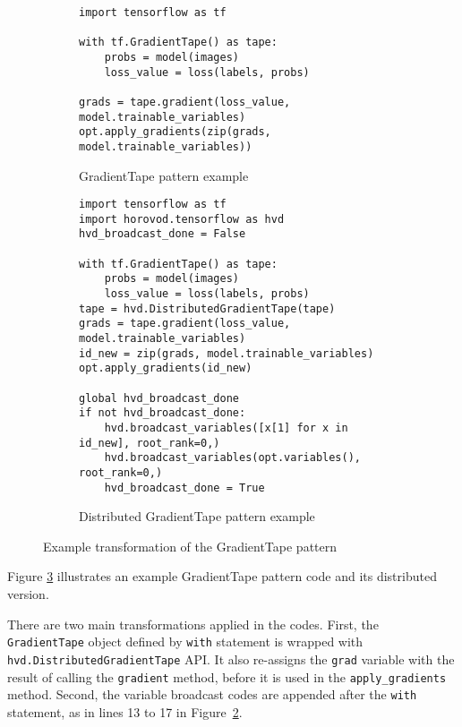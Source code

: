 \begin{figure}[ht!]
  \centering
  \begin{subfigure}[t]{\textwidth}
    \begin{lstlisting}[style=mpython]
import tensorflow as tf

with tf.GradientTape() as tape:
    probs = model(images)
    loss_value = loss(labels, probs)

grads = tape.gradient(loss_value, model.trainable_variables)
opt.apply_gradients(zip(grads, model.trainable_variables))\end{lstlisting}
    \caption{GradientTape pattern example}
    \label{fig:trans:gtapetrans:a}
  \end{subfigure}
  \hspace{5mm}
  \begin{subfigure}[t]{1\textwidth}
    \begin{lstlisting}[style=mpython]
import tensorflow as tf
import horovod.tensorflow as hvd
hvd_broadcast_done = False

with tf.GradientTape() as tape:
    probs = model(images)
    loss_value = loss(labels, probs)
tape = hvd.DistributedGradientTape(tape)
grads = tape.gradient(loss_value, model.trainable_variables)
id_new = zip(grads, model.trainable_variables)
opt.apply_gradients(id_new)

global hvd_broadcast_done
if not hvd_broadcast_done:
    hvd.broadcast_variables([x[1] for x in id_new], root_rank=0,)
    hvd.broadcast_variables(opt.variables(), root_rank=0,)
    hvd_broadcast_done = True\end{lstlisting}
    \caption{Distributed GradientTape pattern example}
    \label{fig:trans:gtapetrans:b}
  \end{subfigure}
  \caption{Example transformation of the GradientTape pattern}
  \label{fig:trans:gtapetrans}
\end{figure}

\noindent
Figure \ref{fig:trans:gtapetrans} illustrates an example GradientTape pattern
code and its distributed version.  
\begin{inred}
There are two main transformations applied in the codes.
First, the {\tt GradientTape} object defined by {\tt with} statement
is wrapped with {\tt hvd.DistributedGradientTape} API.
It also re-assigns the {\tt grad} variable with
the result of calling the {\tt gradient} method,
before it is used in the {\tt apply\_gradients} method.
Second, the variable broadcast codes are appended
after the {\tt with} statement,
as in lines 13 to 17 in Figure~\ref{fig:trans:gtapetrans:b}.
\end{inred}

